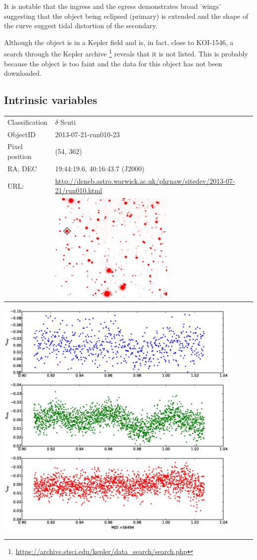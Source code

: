  It is notable that the ingress and the egress demonstrates broad 'wings' suggesting that the object being eclipsed (primary) is extended and the shape of the curve suggest tidal distortion of the secondary.

  Although the object is in a Kepler field and is, in fact, close to KOI-1546, a search through the Kepler archive \footnote{\url{https://archive.stsci.edu/kepler/data_search/search.php}} reveals that it is not listed. This is probably because the object is too faint and the data for this object has not been downloaded. 

\newpage
\subsection{Intrinsic variables}

  \begin{tabular}{l l}
  Classification & $\delta$ Scuti \\
  ObjectID & 2013-07-21-run010-23 \\
  Pixel position & (54, 362) \\
  RA, DEC & 19:44:19.6, 40:16:43.7 (J2000) \\
  URL: & \small \url{http://deneb.astro.warwick.ac.uk/phrnaw/sitedev/2013-07-21/run010.html} \\
       & \includegraphics[width=60mm]{images/2013-07-21-run010-23.png} \\
  \end{tabular}
  \includegraphics[width=120mm]{images/2013-07-21-run010-23_lightcurve.eps} \\
